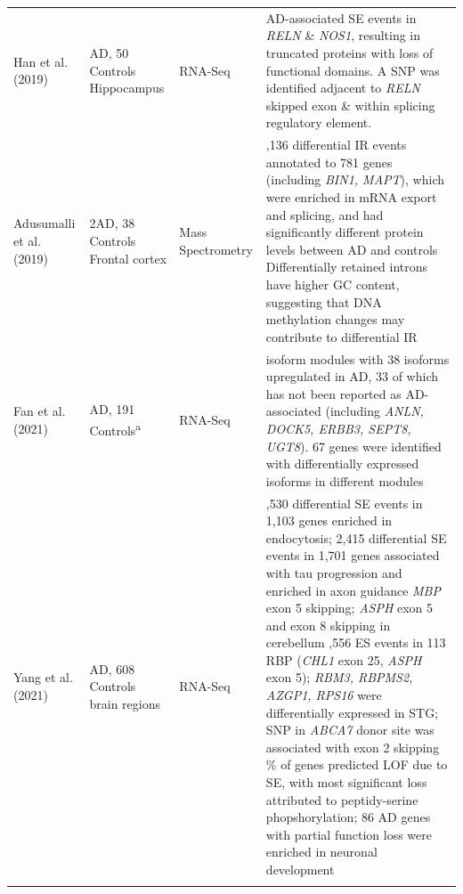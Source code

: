 \begin{changemargin}{1.5cm}
\begin{landscape}
\begin{longtable}[c]{p{3cm}p{4cm}p{3cm}p{16cm}}
			\centering Han et al. (2019) \cite{Han2019} &
			\centering 24 AD, 50 Controls \newline Hippocampus &
			\centering RNA-Seq &
			\tabitem 3 AD-associated SE events in \textit{RELN} \& \textit{NOS1}, resulting in truncated proteins with loss of functional domains. A SNP was identified adjacent to \textit{RELN} skipped exon \& within splicing regulatory element. \\
			
			\centering Adusumalli et al. (2019) \cite{Adusumalli2019} &
			\centering 4 2AD, 38 Controls\cite{Bai2013} \newline Frontal cortex &
			\centering Mass Spectrometry &
			\tabitem 1,136 differential IR events annotated to 781 genes (including \textit{BIN1, MAPT}), which were enriched in mRNA export and splicing, and had significantly different protein levels between AD and controls \newline
			\tabitem Differentially retained introns have higher GC content, suggesting that DNA methylation changes may contribute to differential IR \\
			\hdashline[0.5pt/5pt]
			
			\centering Fan et al. (2021) \cite{Fan2021} &
			\centering 210 AD, 191 Controls\textsuperscript{a} &
			\centering RNA-Seq &
			\tabitem 2 isoform modules with 38 isoforms upregulated in AD, 33 of which has not been reported as AD-associated (including \textit{ANLN, DOCK5, ERBB3, SEPT8, UGT8}). 67 genes were identified with differentially expressed isoforms in different modules  \\
			\hdashline[0.5pt/5pt]
			
			\centering Yang et al. (2021) \cite{Yang2021} &
			\centering 1074 AD, 608 Controls \newline 9 brain regions&
			\centering RNA-Seq & 
			\tabitem 1,530 differential SE events in 1,103 genes enriched in endocytosis; 2,415 differential SE events in 1,701 genes associated with tau progression and enriched in axon guidance \newline 
			\tabitem \textit{MBP} exon 5 skipping; \textit{ASPH} exon 5 and exon 8 skipping in cerebellum \newline  
			\tabitem 15,556 ES events in 113 RBP (\textit{CHL1} exon 25, \textit{ASPH} exon 5); \textit{RBM3, RBPMS2, AZGP1, RPS16} were differentially expressed in STG; SNP in \textit{ABCA7} donor site was associated with exon 2 skipping \newline 
			\tabitem 70\% of genes predicted LOF due to SE, with most significant loss attributed to peptidy-serine phopshorylation; 86 AD genes with partial function loss were enriched in neuronal development	\\
			\hdashline[0.5pt/5pt]		
			

\end{longtable}
\end{landscape}
\end{changemargin}
